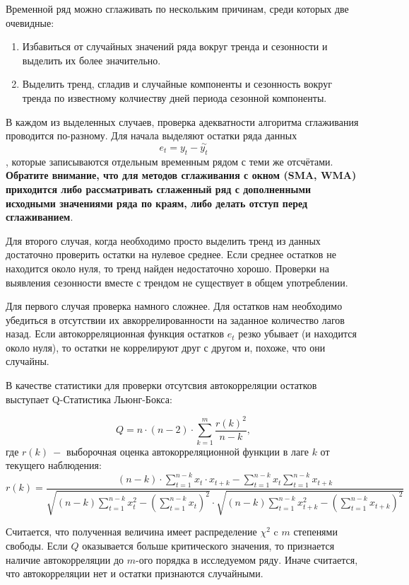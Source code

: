 \documentclass[
]{article}
\begin{document}
Временной ряд можно сглаживать по нескольким причинам, среди которых две
очевидные:

\begin{enumerate}
\def\labelenumi{\arabic{enumi}.}
\item
  Избавиться от случайных значений ряда вокруг тренда и сезонности и
  выделить их более значительно.
\item
  Выделить тренд, сгладив и случайные компоненты и сезонность вокруг
  тренда по известному колчиеству дней периода сезонной компоненты.
\end{enumerate}

В каждом из выделенных случаев, проверка адекватности алгоритма
сглаживания проводится по-разному. Для начала выделяют остатки ряда
данных \[e_t = y_t - \overset{\sim}{y_t}\], которые записываются
отдельным временным рядом с теми же отсчётами. \textbf{Обратите
внимание, что для методов сглаживания с окном (SMA, WMA) приходится либо
рассматривать сглаженный ряд с дополненными исходными значениями ряда по
краям, либо делать отступ перед сглаживанием}.

Для второго случая, когда необходимо просто выделить тренд из данных
достаточно проверить остатки на нулевое среднее. Если среднее остатков
не находится около нуля, то тренд найден недостаточно хорошо. Проверки
на выявления сезонности вместе с трендом не существует в общем
употреблении.

Для первого случая проверка намного сложнее. Для остатков нам необходимо
убедиться в отсутствии их авкоррелированности на заданное количество
лагов назад. Если автокорреляционная функция остатков \(e_t\) резко
убывает (и находится около нуля), то остатки не коррелируют друг с
другом и, похоже, что они случайны.

В качестве статистики для проверки отсутсвия автокорреляции остатков
выступает Q-Статистика Льюнг-Бокса:

\[
Q = n \cdot (n - 2) \cdot \sum \limits_{k=1}^{m}\frac{r(k)^2}{n-k},
\] где \(r(k)\ -\) выборочная оценка автокорреляционной функции в лаге
\(k\) от текущего наблюдения: \[
r(k) = \frac{(n-k)\cdot \sum\limits_{t=1}^{n-k}x_t \cdot x_{t+k} - \sum\limits_{t=1}^{n-k} x_t \sum\limits_{t=1}^{n-k} x_{t+k}}{\sqrt{(n-k)\sum\limits_{t=1}^{n-k}x_t^2 - (\sum\limits_{t=1}^{n-k}x_t)^2} \cdot \sqrt{(n-k)\sum\limits_{t=1}^{n-k}x_{t + k}^2 - (\sum\limits_{t=1}^{n-k}x_{t+k})^2}}
\]

Считается, что полученная величина имеет распределение \(\chi^2\) c
\(m\) степенями свободы. Если \(Q\) оказывается больше критического
значения, то признается наличие автокорреляции до \(m\)-ого порядка в
исследуемом ряду. Иначе считается, что автокорреляции нет и остатки
признаются случайными.
\end{document}
